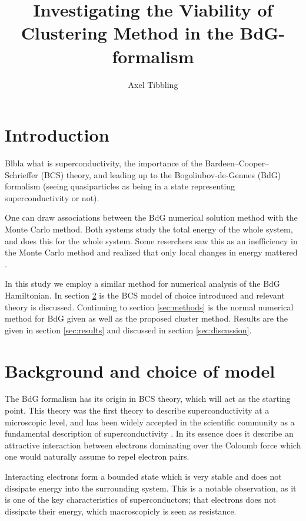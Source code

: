 \documentclass[11pt,twocolumn]{article}
\title{Investigating the Viability of Clustering Method in the BdG-formalism}
\author{Axel Tibbling}
\date{ }
\begin{document}
\maketitle

\section{Introduction}\label{sec:introduction}

Blbla what is superconductivity, the importance of the Bardeen–Cooper–Schrieffer (BCS) theory, and leading up to the Bogoliubov-de-Gennes (BdG) formalism (seeing quasiparticles as being in a state representing superconductivity or not). 

One can draw associations between the BdG numerical solution method with the Monte Carlo method. Both systems study the total energy of the whole system, and does this for the whole system. Some reserchers saw this as an inefficiency in the Monte Carlo method and realized that only local changes in energy mattered \cite{karmakarDisorderStabilizedBreachedpair2022, kumarTravellingClusterApproximation2006}. 


In this study we employ a similar method for numerical analysis of the BdG Hamiltonian. In section \ref{sec:background} is the BCS model of choice introduced and relevant theory is discussed. Continuing to section \ref{sec:methods} is the normal numerical method for BdG given as well as the proposed cluster method. Results are the given in section \ref{sec:results} and discussed in section \ref{sec:discussion}.  


\section{Background and choice of model}\label{sec:background}

The BdG formalism has its origin in BCS theory, which will act as the starting point. This theory was the first theory to describe superconductivity at a microscopic level, and has been widely accepted in the scientific community as a fundamental description of superconductivity \cite{girvinModernCondensedMatter2019, sharmaReviewTheoriesSuperconductivity2015}. In its essence does it describe an attractive interaction between electrons dominating over the Coloumb force which one would naturally assume to repel electron pairs. 

Interacting electrons form a bounded state which is very stable and does not dissipate energy into the surrounding system. This is a notable observation, as it is one of the key characteristics of superconductors; that electrons does not dissipate their energy, which macroscopicly is seen as resistance.
\end{document}
